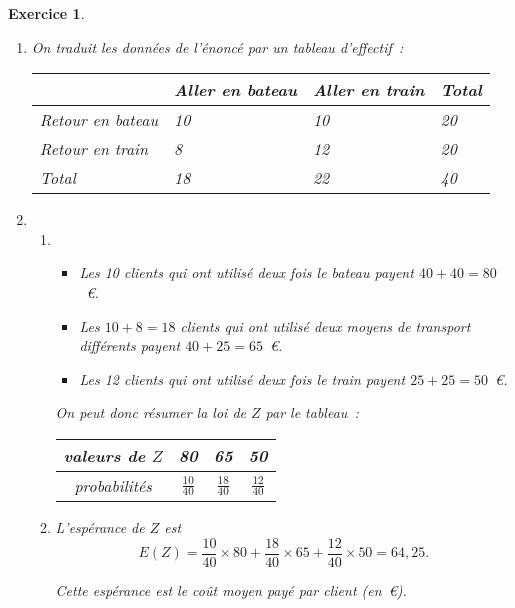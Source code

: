 \documentclass[10pt]{article}
\newtheorem{exo}{Exercice}
\begin{document}
\begin{exo}




\begin{enumerate}
\item On traduit les données de l'énoncé par un tableau d'effectif~:


\begin{center}
 \begin{tabular}{|m{3.5cm}|m{3.5cm}|m{3.5cm}|m{2cm}|}\hline
& Aller en bateau &Aller en train & Total \\ \hline 
Retour en bateau& 10 & 10&20 \\ \hline
Retour en train& 8& 12&20 \\ \hline
Total& 18& 22&40 \\ \hline
\end{tabular}
\end{center}
\item \begin{enumerate}
\item 
\begin{itemize}
\item[\textbullet] Les 10 clients qui ont utilisé deux fois le bateau payent $40+40=80$~\euro.
\item[\textbullet] Les $10+8=18$ clients qui ont utilisé deux moyens de transport différents   payent $40+25=65$~\euro. 
\item[\textbullet] Les 12 clients qui ont utilisé deux fois le train payent $25+25=50$~\euro. 
\end{itemize}

On peut donc résumer la loi de $Z$ par le tableau~:

\begin{center}
\renewcommand{\arraystretch}{1.5}
\begin{tabular}{|c|c|c|c|}
\hline
    valeurs de $Z$     & 80       & 65       & 50   \\
\hline
probabilités & $\frac{10}{40}$ &$\frac{18}{40}$ &$\frac{12}{40}$      \\
\hline
\end{tabular}
\end{center}

\item L'espérance de $Z$ est \[E(Z)=\frac{10}{40}\times 80+\frac{18}{40}\times 65+\frac{12}{40}\times 50= 64,25.\]

Cette espérance est le coût moyen payé par client (en~\euro ).
\end{enumerate}
\end{enumerate}

\end{exo}
\end{document}
